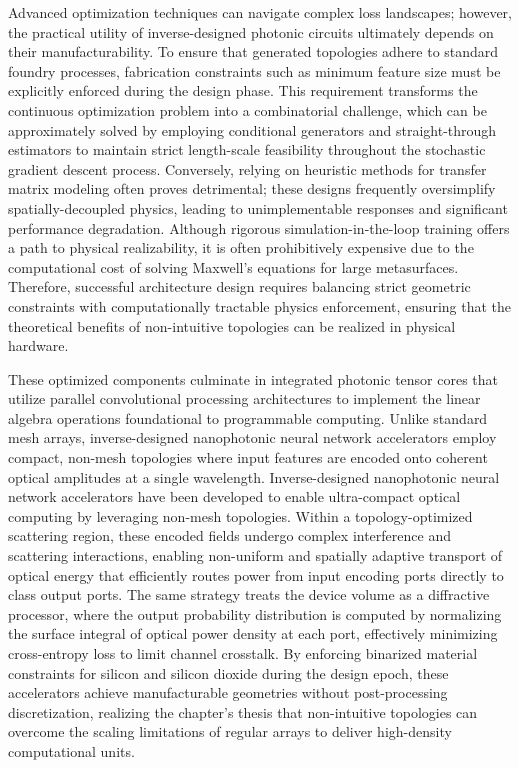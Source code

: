 \documentclass[11pt]{article}
\begin{document}
Advanced optimization techniques can navigate complex loss landscapes; however, the practical utility of inverse-designed photonic circuits ultimately depends on their manufacturability. To ensure that generated topologies adhere to standard foundry processes, fabrication constraints such as minimum feature size must be explicitly enforced during the design phase. This requirement transforms the continuous optimization problem into a combinatorial challenge, which can be approximately solved by employing conditional generators and straight-through estimators to maintain strict length-scale feasibility throughout the stochastic gradient descent process. \citep{doi_10_1021_acsphotonics_2c00313_0d7d39c3} Conversely, relying on heuristic methods for transfer matrix modeling often proves detrimental; these designs frequently oversimplify spatially-decoupled physics, leading to unimplementable responses and significant performance degradation. Although rigorous simulation-in-the-loop training offers a path to physical realizability, it is often prohibitively expensive due to the computational cost of solving Maxwell's equations for large metasurfaces. Therefore, successful architecture design requires balancing strict geometric constraints with computationally tractable physics enforcement, ensuring that the theoretical benefits of non-intuitive topologies can be realized in physical hardware. \citep{doi_10_1021_acsphotonics_2c00313_0d7d39c3} \citep{doi_10_48550_arxiv_2505_18377_a6fc9ec3}

These optimized components culminate in integrated photonic tensor cores that utilize parallel convolutional processing architectures to implement the linear algebra operations foundational to programmable computing. Unlike standard mesh arrays, inverse-designed nanophotonic neural network accelerators employ compact, non-mesh topologies where input features are encoded onto coherent optical amplitudes at a single wavelength. Inverse-designed nanophotonic neural network accelerators have been developed to enable ultra-compact optical computing by leveraging non-mesh topologies. \citep{doi_10_1038_s41467_026_68648_1_26658a9c} Within a topology-optimized scattering region, these encoded fields undergo complex interference and scattering interactions, enabling non-uniform and spatially adaptive transport of optical energy that efficiently routes power from input encoding ports directly to class output ports. The same strategy treats the device volume as a diffractive processor, where the output probability distribution is computed by normalizing the surface integral of optical power density at each port, effectively minimizing cross-entropy loss to limit channel crosstalk. By enforcing binarized material constraints for silicon and silicon dioxide during the design epoch, these accelerators achieve manufacturable geometries without post-processing discretization, realizing the chapter's thesis that non-intuitive topologies can overcome the scaling limitations of regular arrays to deliver high-density computational units. \citep{doi_10_1515_nanoph_2022_0423_38a2c3ec} \citep{doi_10_1038_s41467_026_68648_1_26658a9c}
\end{document}
